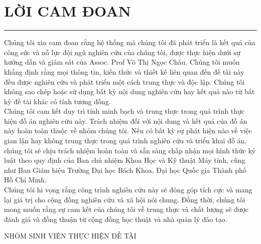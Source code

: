 


\null\vfill
\section*{LỜI CAM ĐOAN}
\hrule
\vspace{1 cm}


Chúng tôi xin cam đoan rằng hệ thống mà chúng tôi đã phát triển là kết quả của công sức và nỗ lực đội ngũ nghiên cứu của chúng tôi, được thực hiện dưới sự hướng dẫn và giám sát của Assoc. Prof Võ Thị Ngọc Châu. Chúng tôi muốn khẳng định rằng mọi thông tin, kiến thức và thiết kế liên quan đến đề tài này đều được nghiên cứu và phát triển một cách trung thực và độc lập. Chúng tôi không sao chép hoặc sử dụng bất kỳ nội dung nghiên cứu hay kết quả nào từ bất kỳ đề tài khác có tính tương đồng. \\

Chúng tôi cam kết duy trì tính minh bạch và trung thực trong quá trình thực hiện đồ án nghiên cứu này. Trách nhiệm đối với nội dung và kết quả của đồ án này hoàn toàn thuộc về nhóm chúng tôi. Nếu có bất kỳ sự phát hiện nào về việc gian lận hay không trung thực trong quá trình nghiên cứu và triển khai đồ án, chúng tôi sẽ chịu trách nhiệm hoàn toàn và sẵn sàng chấp nhận mọi hình thức kỷ luật theo quy định của Ban chủ nhiệm Khoa Học và Kỹ thuật Máy tính, cũng như Ban Giám hiệu Trường Đại học Bách Khoa, Đại học Quốc gia Thành phố Hồ Chí Minh.\\

Chúng tôi hi vọng rằng công trình nghiên cứu này sẽ đóng góp tích cực và mang lại giá trị cho cộng đồng nghiên cứu và xã hội nói chung. Đồng thời, chúng tôi mong muốn rằng sự cam kết của chúng tôi về trung thực và chất lượng sẽ được đánh giá và đồng thuận từ cộng đồng học thuật và nhà quản lý đào tạo.\\


\begin{flushright}
    NHÓM SINH VIÊN THỰC HIỆN ĐỀ TÀI
\end{flushright}
\vfill\null

\null\vfill
\vfill\null


